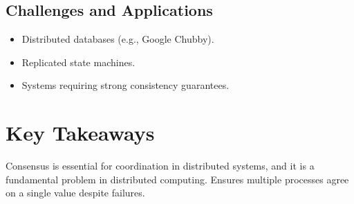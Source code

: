 \subsection{Challenges and Applications}
{
\begin{itemize}
	\item Distributed databases (e.g., Google Chubby).
	\item Replicated state machines.
	\item Systems requiring strong consistency guarantees.
\end{itemize}
}

\section{Key Takeaways}
Consensus is essential for coordination in distributed systems, and it is a fundamental problem in distributed computing.
Ensures multiple processes agree on a single value
despite failures.

